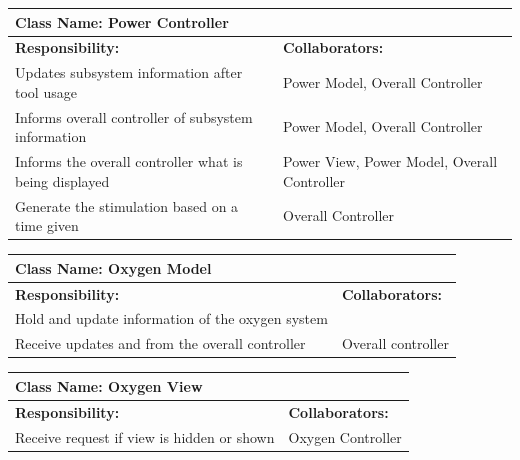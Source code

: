 \documentclass[12pt, titlepage]{article}
\begin{document}
\begin{enumerate}[a)]
	\begin{table}[H]
		\centering
		\begin{tabular}{|p{10cm}|p{5cm}|}
		\hline 
		 \multicolumn{2}{|l|}{\textbf{Class Name: Power Controller}} \\
		\hline
		\textbf{Responsibility:} & \textbf{Collaborators:} \\
		\hline
		Updates subsystem information after tool usage & Power Model, Overall Controller\\
		\hline
		 Informs overall controller of subsystem information & Power Model, Overall Controller\\
		\hline
		 Informs the overall controller what is being displayed & Power View, Power Model, Overall Controller\\
		\hline
		 Generate the stimulation based on a time given & Overall Controller \\
		\hline
		\end{tabular}
	\end{table}

	\begin{table}[H]
		\centering
		\begin{tabular}{|p{10cm}|p{5cm}|}
		\hline 
		 \multicolumn{2}{|l|}{\textbf{Class Name: Oxygen Model}} \\
		\hline
		\textbf{Responsibility:} & \textbf{Collaborators:} \\
		\hline
		 Hold and update information of the oxygen system & \\
		\hline
		Receive updates and from the overall controller & Overall controller \\
		\hline
		\end{tabular}
	\end{table}

	\begin{table}[H]
		\centering
		\begin{tabular}{|p{10cm}|p{5cm}|}
		\hline 
		 \multicolumn{2}{|l|}{\textbf{Class Name: Oxygen View}} \\
		\hline
		\textbf{Responsibility:} & \textbf{Collaborators:} \\
		\hline 
		 Receive request if view is hidden or shown & Oxygen Controller\\
		\hline
		\end{tabular}
	\end{table}


\end{enumerate}
\end{document}
